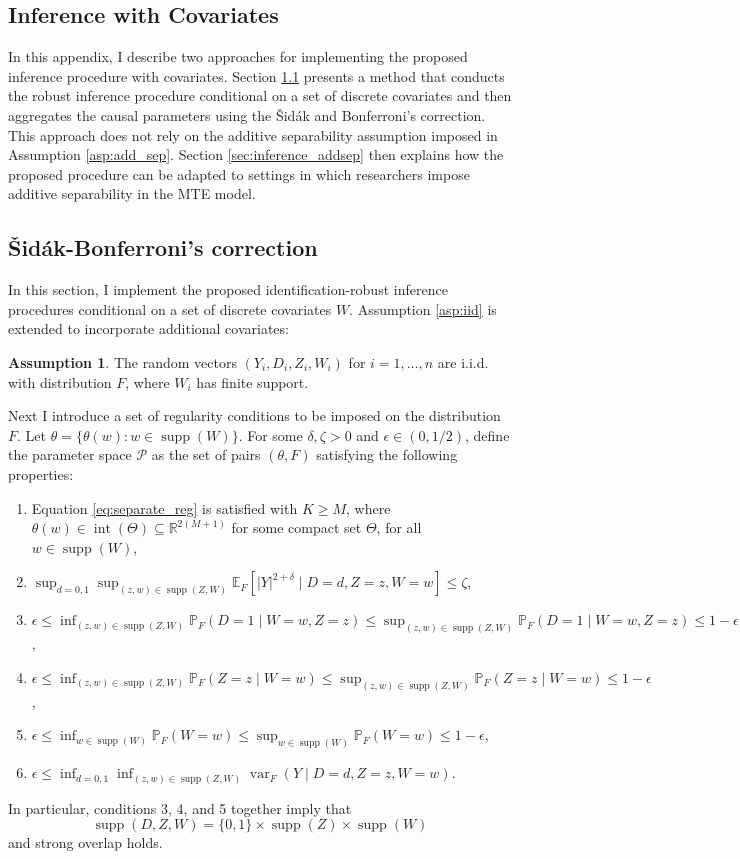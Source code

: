 \documentclass[11pt]{article}
\theoremstyle{definition}
\newtheorem{assumption}{Assumption}
\DeclareMathOperator*{\supp}{supp}
\DeclareMathOperator{\var}{var}
\newcommand{\R}{\ensuremath{\mathbb{R}}}
\newcommand{\Exp}{\ensuremath{\mathbb{E}}} %
\newcommand{\Prob}{\ensuremath{\mathbb{P}}} %
\newcommand{\0}{\ensuremath{\mathbf{0}}}
\begin{document}
\begin{bibunit}
\section{Inference with Covariates}
\label{appendix:inference_covariates}
In this appendix, I describe two approaches for implementing the proposed inference procedure with covariates. Section \ref{sec:sidak_correction} presents a method that conducts the robust inference procedure conditional on a set of discrete covariates and then aggregates the causal parameters using the Šidák and Bonferroni's correction. This approach does not rely on the additive separability assumption imposed in Assumption \ref{asp:add_sep}. Section \ref{sec:inference_addsep} then explains how the proposed procedure can be adapted to settings in which researchers impose additive separability in the MTE model.



\subsection{\v Sidák-Bonferroni's correction}
\label{sec:sidak_correction}
In this section, I implement the proposed identification-robust inference procedures conditional on a set of discrete covariates $W$. Assumption \ref{asp:iid} is extended to incorporate additional covariates:
\begin{assumption}
\label{asp:iid_covariate}
The random vectors $(Y_i,D_i,Z_i,W_i)$ for $i = 1,\ldots,n$ are i.i.d. with distribution $F$, where $W_i$ has finite support.
\end{assumption}

Next I introduce a set of regularity conditions to be imposed on the distribution $F$. Let $\theta = \{\theta(w): w\in\supp(W)\}$. For some $\delta, \zeta > 0$ and $\epsilon \in (0,1/2)$, define the parameter space $\mathcal{P}$ as the set of pairs $(\theta,F)$ satisfying the following properties:
\begin{enumerate}
	\item Equation \eqref{eq:separate_reg} is satisfied with $K \geq M$, where $\theta(w) \in \operatorname{int}(\Theta) \subseteq \R^{2(M+1)}$ for some compact set $\Theta$, for all $w\in \supp(W)$,
	\item $\sup_{d=0,1}\sup_{(z,w) \in \supp(Z,W)}\Exp_F[|Y|^{2+\delta}\mid D=d, Z=z, W=w] \leq \zeta$,
	\item $\epsilon \leq \inf_{(z,w) \in \supp(Z,W)}\Prob_F(D=1\mid W=w,Z=z) \leq \sup_{(z,w) \in \supp(Z,W)}\Prob_F(D=1\mid W=w, Z=z) \leq 1-\epsilon$,
	\item $\epsilon \leq \inf_{(z,w) \in \supp(Z,W)}\Prob_F(Z=z \mid W=w) \leq \sup_{(z,w) \in \supp(Z,W)} \Prob_{F}(Z=z \mid W=w) \leq 1-\epsilon$,
	\item $\epsilon \leq \inf_{w\in\supp(W)} \Prob_F(W=w) \leq \sup_{w\in\supp(W)} \Prob_F(W=w) \leq 1-\epsilon$,
 	\item $\epsilon \leq \inf_{d=0,1}\inf_{(z,w) \in \supp(Z,W)}\var_F(Y\mid D=d, Z=z, W=w)$.
\end{enumerate}
In particular, conditions 3, 4, and 5 together imply that 
\[
	\supp(D,Z,W) = \{0,1\}\times \supp(Z) \times \supp(W)
\]
and strong overlap holds.


\end{bibunit}
\end{document}
